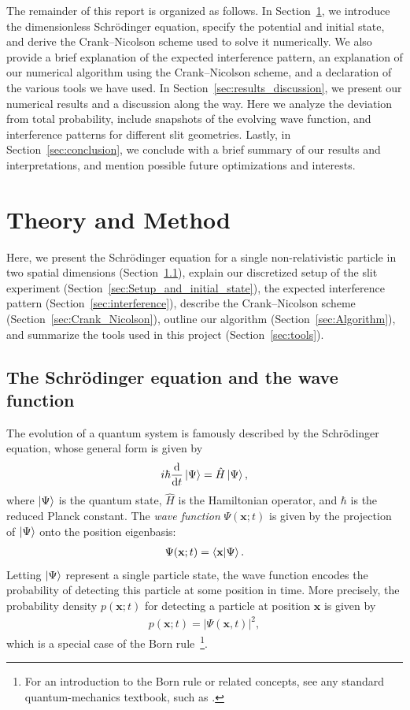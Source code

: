 \documentclass[aps,pra,reprint,amsmath,amssymb,twocolumn,preprintnumbers,superscriptaddress,10pt]{revtex4-2}
\renewcommand{\vec}[1]{\mathbf{#1}}
\begin{document}
The remainder of this report is organized as follows. 
In Section~\ref{sec:theory_and_method}, we introduce the dimensionless Schr\"odinger equation, specify the potential and initial state, and derive the Crank--Nicolson scheme used to solve it numerically. 
We also provide a brief explanation of the expected interference pattern, an explanation of our numerical algorithm using the Crank--Nicolson scheme, and a declaration of the various tools we have used.
In Section~\ref{sec:results_discussion}, we present our numerical results and a discussion along the way. 
Here we analyze the deviation from total probability, include snapshots of the evolving wave function, and interference patterns for different slit geometries. Lastly, in Section~\ref{sec:conclusion}, we conclude with a brief summary of our results and interpretations, and mention possible future optimizations and interests.


\section{Theory and Method} \label{sec:theory_and_method}

Here, we present the Schr\"odinger equation for a single non-relativistic particle in two spatial dimensions (Section~\ref{sec:QM_double_slit}), explain our discretized setup of the slit experiment (Section~\ref{sec:Setup_and_initial_state}), the expected interference pattern (Section~\ref{sec:interference}), describe the Crank--Nicolson scheme (Section~\ref{sec:Crank_Nicolson}), outline our algorithm (Section~\ref{sec:Algorithm}), and summarize the tools used in this project (Section~\ref{sec:tools}).


\subsection{The Schr\"odinger equation and the wave function} \label{sec:QM_double_slit}

The evolution of a quantum system is famously described by the Schrödinger equation, whose general form is given by
\begin{align}
    i \hbar \dv{}{t}\ket{\Psi} = \hat{H} \ket{\Psi},
\end{align}
where $\ket{\Psi}$ is the quantum state, $\hat{H}$ is the Hamiltonian operator, and $\hbar$ is the reduced Planck constant. The \emph{wave function} \(\Psi(\vec{x}; t)\) is given by the projection of \(\ket{\Psi}\) onto the position eigenbasis:
\begin{align}
    \Psi(\vec{x}; t) = \bra{\vec{x}}\ket{\Psi}.
\end{align}
Letting \(\ket{\Psi}\) represent a single particle state, the wave function encodes the probability of detecting this particle at some position in time.
More precisely, the probability density \(p(\vec{x};t)\) for detecting a particle at position \(\vec{x}\) is given by
\begin{align}
    p(\vec{x};t) = |\Psi(\vec{x},t)|^2,    \label{eq:Born_rule}
\end{align}
which is a special case of the Born rule~\footnote{For an introduction to the Born rule or related concepts, see any standard quantum-mechanics textbook, such as \cite{GriffithsSchroeter2018}.}.
\end{document}
